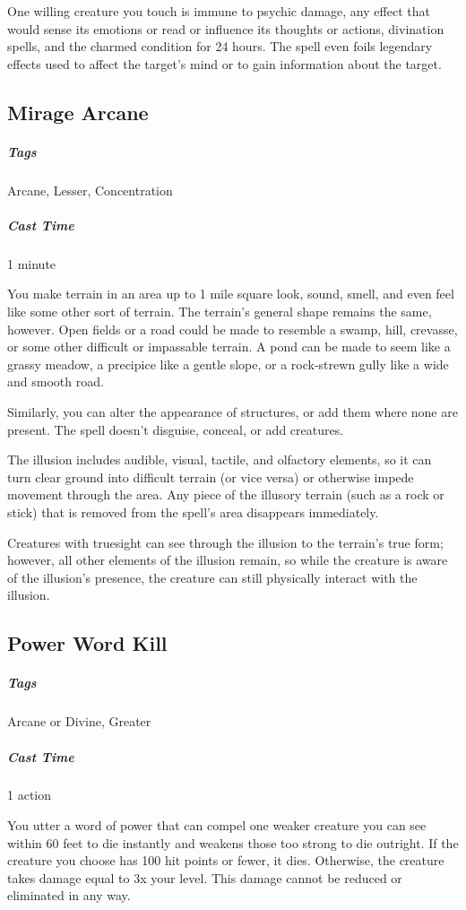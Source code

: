 One willing creature you touch is immune to psychic damage, any effect that would sense its emotions or read or influence its thoughts or actions, divination spells, and the charmed condition for 24 hours. The spell even foils legendary effects used to affect the target’s mind or to gain information about the target.

\subsection{Mirage Arcane}
\subparagraph*{Tags} Arcane, Lesser, Concentration
\subparagraph*{Cast Time} 1 minute

You make terrain in an area up to 1 mile square look, sound, smell, and even feel like some other sort of terrain. The terrain's general shape remains the same, however. Open fields or a road could be made to resemble a swamp, hill, crevasse, or some other difficult or impassable terrain. A pond can be made to seem like a grassy meadow, a precipice like a gentle slope, or a rock-strewn gully like a wide and smooth road.

Similarly, you can alter the appearance of structures, or add them where none are present. The spell doesn't disguise, conceal, or add creatures.

The illusion includes audible, visual, tactile, and olfactory elements, so it can turn clear ground into difficult terrain (or vice versa) or otherwise impede movement through the area. Any piece of the illusory terrain (such as a rock or stick) that is removed from the spell's area disappears immediately.

Creatures with truesight can see through the illusion to the terrain's true form; however, all other elements of the illusion remain, so while the creature is aware of the illusion's presence, the creature can still physically interact with the illusion.

\subsection{Power Word Kill}
\subparagraph*{Tags} Arcane or Divine, Greater
\subparagraph*{Cast Time} 1 action

You utter a word of power that can compel one weaker creature you can see within 60 feet to die instantly and weakens those too strong to die outright. If the creature you choose has 100 hit points or fewer, it dies. Otherwise, the creature takes damage equal to 3x your level. This damage cannot be reduced or eliminated in any way.

